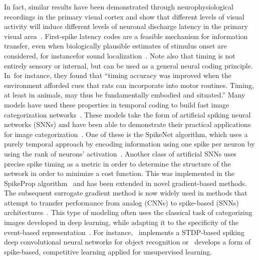\documentclass[brainsci, %
               review,accept,pdftex,moreauthors %
               ]{Definitions/mdpi}
\newcommand{\mynote}[1]{{\sethlcolor{yellow}\hl{#1}}}
\providecommand{\DIFadd}[1]{{\protect\color{blue}\uwave{#1}}} %
\providecommand{\DIFaddbegin}{} %
\providecommand{\DIFaddend}{} %
\newcommand{\DIFaddincludegraphics}[2][]{{\color{blue}\fbox{\DIFOincludegraphics[#1]{#2}}}} %
\DeclareRobustCommand{\DIFaddbegin}{\DIFOaddbegin \let\includegraphics\DIFaddincludegraphics} %
\DeclareRobustCommand{\DIFaddend}{\DIFOaddend \let\includegraphics\DIFOincludegraphics} %
\begin{document}
\DIFaddend %
In fact, similar results have been demonstrated through neurophysiological recordings in the primary visual cortex and show that different levels of visual activity will induce different levels of neuronal discharge latency in the primary visual area~\citep{celebrini_dynamics_1993}. First-spike latency codes are a feasible mechanism for information transfer, even when biologically plausible estimates of \DIFaddbegin \DIFadd{the }\DIFaddend stimulus onset are considered, for instance\DIFaddbegin \DIFadd{, }\DIFaddend for sound localization~\citep{chase_first-spike_2007}.  Note also that timing is not entirely sensory or internal, but can be used as a general neural coding principle. In~\citep{safaie_turning_2020}\DIFaddbegin \DIFadd{, }\DIFaddend for instance, they found that \DIFaddbegin \DIFadd{the }\DIFaddend ``timing accuracy was improved when the environment afforded cues that rats can incorporate into motor routines. Timing, at least in animals, may thus be fundamentally embodied and situated.''  Many models have used these properties in temporal coding to build fast image categorization networks~\citep{gautrais_rate_1998,delorme_spikenet_1999, perrinet_coding_2004}. These models take the form of artificial spiking neural networks (SNNs) and have been able to demonstrate their practical applications for image categorization~\citep{delorme_ultra-rapid_2000}. One of these is the SpikeNet algorithm, which uses a purely temporal approach by encoding information using one spike per neuron by using the rank of neurons' activation~\citep{delorme_spikenet_1999,bonilla_analyzing_2022}. Another class of artificial SNNs uses precise spike timing as a metric in order to determine the structure of the network in order to minimize a cost function. This was implemented in the SpikeProp algorithm~\citep{bohte_error-backpropagation_2002} and has been extended in novel gradient-based methods. The subsequent surrogate gradient method is now widely used in methods that attempt to transfer performance from analog (CNNs) to spike-based (SNNs) architectures~\citep{zenke_remarkable_2021}. This type of modeling often uses the classical task of categorizing images developed in deep learning, while adapting it to the specificity of the event-based representation~\citep{goltz_fast_2021}. For instance,~\citep{kheradpisheh_stdp-based_2018} implements a STDP-based spiking deep convolutional neural networks for object recognition or~\citep{tavanaei_representation_2018} develops a form of spike-based, competitive learning applied for unsupervised learning. 
\end{document}
